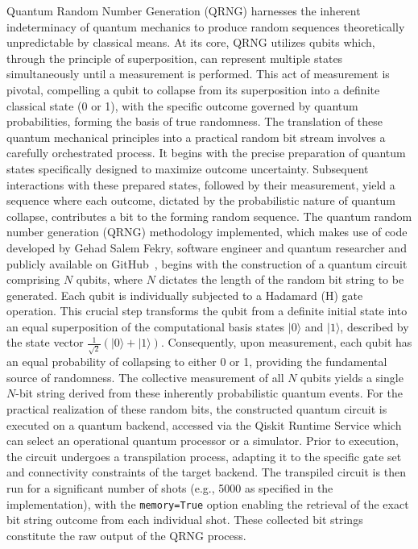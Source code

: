 Quantum Random Number Generation (QRNG) harnesses the inherent indeterminacy of quantum mechanics to produce random sequences theoretically unpredictable by classical means. At its core, QRNG utilizes qubits which, through the principle of superposition, can represent multiple states simultaneously until a measurement is performed. This act of measurement is pivotal, compelling a qubit to collapse from its superposition into a definite classical state (0 or 1), with the specific outcome governed by quantum probabilities, forming the basis of true randomness.
The translation of these quantum mechanical principles into a practical random bit stream involves a carefully orchestrated process. It begins with the precise preparation of quantum states specifically designed to maximize outcome uncertainty. Subsequent interactions with these prepared states, followed by their measurement, yield a sequence where each outcome, dictated by the probabilistic nature of quantum collapse, contributes a bit to the forming random sequence.
The quantum random number generation (QRNG) methodology implemented, which makes use of code developed by Gehad Salem Fekry, software engineer and quantum researcher and publicly available on GitHub~\cite{FekryQRNG2023}, begins with the construction of a quantum circuit comprising $N$ qubits, where $N$ dictates the length of the random bit string to be generated. Each qubit is individually subjected to a Hadamard (H) gate operation. This crucial step transforms the qubit from a definite initial state into an equal superposition of the computational basis states $|0\rangle$ and $|1\rangle$, described by the state vector $\frac{1}{\sqrt{2}}(|0\rangle + |1\rangle)$. Consequently, upon measurement, each qubit has an equal probability of collapsing to either 0 or 1, providing the fundamental source of randomness. The collective measurement of all $N$ qubits yields a single $N$-bit string derived from these inherently probabilistic quantum events.
For the practical realization of these random bits, the constructed quantum circuit is executed on a quantum backend, accessed via the Qiskit Runtime Service which can select an operational quantum processor or a simulator. Prior to execution, the circuit undergoes a transpilation process, adapting it to the specific gate set and connectivity constraints of the target backend. The transpiled circuit is then run for a significant number of shots (e.g., 5000 as specified in the implementation), with the \texttt{memory=True} option enabling the retrieval of the exact bit string outcome from each individual shot. These collected bit strings constitute the raw output of the QRNG process.
